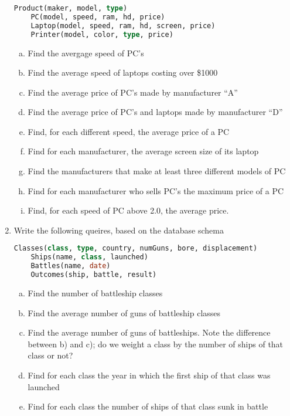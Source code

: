 \documentclass[12pt]{article}
\begin{document}
\begin{enumerate}[1.]
    \begin{lstlisting}[language=SQL]
    Product(maker, model, type)
    PC(model, speed, ram, hd, price)
    Laptop(model, speed, ram, hd, screen, price)
    Printer(model, color, type, price)
    \end{lstlisting}

    \begin{enumerate}[a)]
        \item Find the avergage speed of PC's
        \item Find the average speed of laptops costing over \$1000
        \item Find the average price of PC's made by manufacturer ``A''
        \item Find the average price of PC's and laptops made by manufacturer ``D''
        \item Find, for each different speed, the average price of a PC
        \item Find for each manufacturer, the average screen size of its laptop
        \item Find the manufacturers that make at least three different models of PC
        \item Find for each manufacturer who sells PC's the maximum price of a PC
        \item Find, for each speed of PC above 2.0, the average price.
    \end{enumerate}

    \item Write the following queires, based on the database schema

    \begin{lstlisting}[language=SQL]
    Classes(class, type, country, numGuns, bore, displacement)
    Ships(name, class, launched)
    Battles(name, date)
    Outcomes(ship, battle, result)
    \end{lstlisting}

    \bigskip

    \begin{enumerate}[a)]
        \item Find the number of battleship classes
        \item Find the average number of guns of battleship classes
        \item Find the average number of guns of battleships. Note the difference
        between b) and c); do we weight a class by the number of ships of that class
        or not?
        \item Find for each class the year in which the first ship of that class was
        launched
        \item Find for each class the number of ships of that class sunk in battle
    \end{enumerate}


\end{enumerate}
\end{document}

